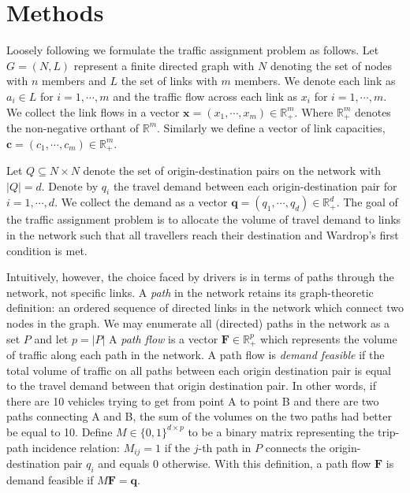 \section{Methods}\label{sec:methods}

Loosely following \citet{smith1979existence} we formulate the traffic assignment problem as follows.
Let $G=(N,L)$ represent a finite directed graph with $N$ denoting the set of nodes with $n$ members and $L$ the set of links with $m$ members.
We denote each link as $a_i\in L$ for $i=1,\cdots,m$ and the traffic flow across each link as $x_i$ for $i=1,\cdots,m$.
We collect the link flows in a vector $\mathbf{x}=(x_1,\cdots, x_m)\in\mathbb{R}_+^m$. 
Where $\mathbb{R}_+^m$ denotes the non-negative orthant of $\mathbb{R}^m$.
Similarly we define a vector of link capacities, $\mathbf{c}=(c_1, \cdots, c_m)\in \mathbb{R}_+^m$.

Let $Q\subseteq N\times N$ denote the set of origin-destination pairs on the network with $|Q| = d$.
Denote by $q_i$ the travel demand between each origin-destination pair for $i=1,\cdots,d$.
We collect the demand as a vector $\mathbf{q}=(q_1, \cdots, q_d)\in\mathbb{R}_+^d$. 
The goal of the traffic assignment problem is to allocate the volume of travel demand to links in the network such that all travellers reach their destination and Wardrop's first condition is met.

Intuitively, however, the choice faced by drivers is in terms of paths through the network, not specific links.
A \textit{path} in the network retains its graph-theoretic definition: an ordered sequence of directed links in the network which connect two nodes in the graph. 
We may enumerate all (directed) paths in the network as a set $P$ and let $p=|P|$
A \textit{path flow} is a vector $\mathbf{F}\in \mathbb{R}^p_+$ which represents the volume of traffic along each path in the network.
A path flow is \textit{demand feasible} if the total volume of traffic on all paths between each origin destination pair is equal to the travel demand between that origin destination pair.
In other words, if there are 10 vehicles trying to get from point A to point B and there are two paths connecting A and B, the sum of the volumes on the two paths had better be equal to 10.
Define $M \in \{0, 1\}^{d\times p}$ to be a binary matrix representing the trip-path incidence relation: $M_{ij} = 1$ if the $j$-th path in $P$ connects the origin-destination pair $q_i$ and equals $0$ otherwise.
With this definition, a path flow $\mathbf{F}$ is demand feasible if $M\mathbf{F}=\mathbf{q}$.

